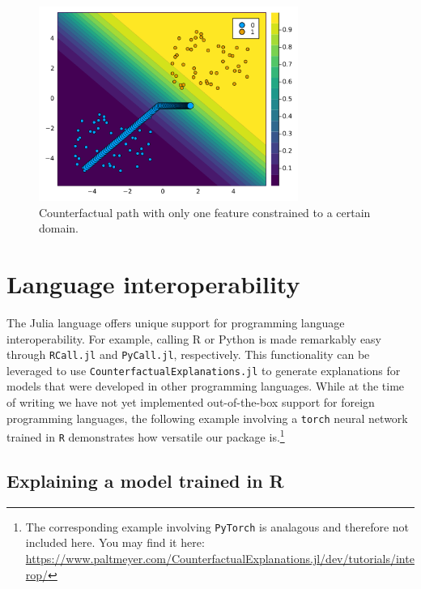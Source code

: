 \documentclass{juliacon}
\begin{document}
\begin{figure}

{\centering \includegraphics[width=3.33333in,height=2.5in]{www/constraint_domain.png}

}

\caption{\label{fig-domain}Counterfactual path with only one feature
constrained to a certain domain.}

\end{figure}

\hypertarget{language-interoperability}{%
\section{Language interoperability}\label{language-interoperability}}

The Julia language offers unique support for programming language
interoperability. For example, calling R or Python is made remarkably
easy through \texttt{RCall.jl} and \texttt{PyCall.jl}, respectively.
This functionality can be leveraged to use
\texttt{CounterfactualExplanations.jl} to generate explanations for
models that were developed in other programming languages. While at the
time of writing we have not yet implemented out-of-the-box support for
foreign programming languages, the following example involving a
\texttt{torch} neural network trained in \texttt{R} demonstrates how
versatile our package is.\footnote{The corresponding example involving
  \texttt{PyTorch} is analagous and therefore not included here. You may
  find it here:
  \url{https://www.paltmeyer.com/CounterfactualExplanations.jl/dev/tutorials/interop/}}

\hypertarget{explaining-a-model-trained-in-r}{%
\subsection{Explaining a model trained in
R}\label{explaining-a-model-trained-in-r}}
\end{document}
